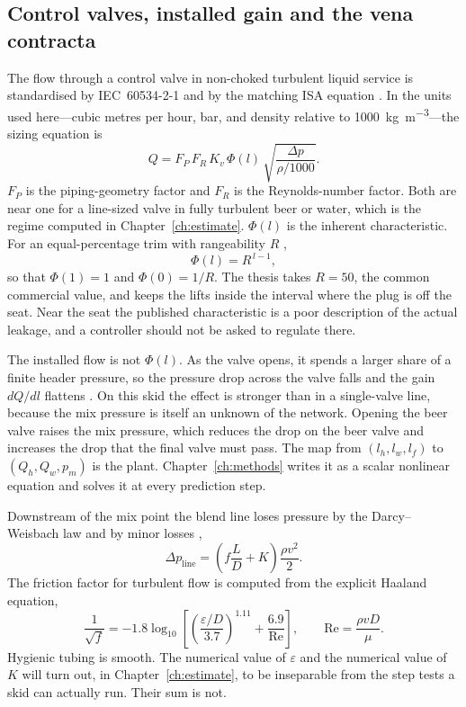 \subsection{Control valves, installed gain and the vena contracta}

The flow through a control valve in non-choked turbulent liquid service is standardised by IEC~60534-2-1 and by the matching ISA equation \citep{iec60534,isa75}. In the units used here---cubic metres per hour, bar, and density relative to \SI{1000}{\kilogram\per\cubic\metre}---the sizing equation is
\begin{equation}
\label{eq:kv}
Q = F_P\,F_R\,K_v\,\Phi(l)\,\sqrt{\frac{\Delta p}{\rho/1000}}.
\end{equation}
$F_P$ is the piping-geometry factor and $F_R$ is the Reynolds-number factor. Both are near one for a line-sized valve in fully turbulent beer or water, which is the regime computed in Chapter~\ref{ch:estimate}. $\Phi(l)$ is the inherent characteristic. For an equal-percentage trim with rangeability $R$ \citep{fisher2005},
\begin{equation}
\label{eq:eqpct}
\Phi(l) = R^{\,l-1},
\end{equation}
so that $\Phi(1)=1$ and $\Phi(0)=1/R$. The thesis takes $R=50$, the common commercial value, and keeps the lifts inside the interval where the plug is off the seat. Near the seat the published characteristic is a poor description of the actual leakage, and a controller should not be asked to regulate there.

The installed flow is not $\Phi(l)$. As the valve opens, it spends a larger share of a finite header pressure, so the pressure drop across the valve falls and the gain $dQ/dl$ flattens \citep{shinskey1996,fisher2005}. On this skid the effect is stronger than in a single-valve line, because the mix pressure is itself an unknown of the network. Opening the beer valve raises the mix pressure, which reduces the drop on the beer valve and increases the drop that the final valve must pass. The map from $(l_h,l_w,l_f)$ to $(Q_h,Q_w,p_m)$ is the plant. Chapter~\ref{ch:methods} writes it as a scalar nonlinear equation and solves it at every prediction step.

Downstream of the mix point the blend line loses pressure by the Darcy--Weisbach law and by minor losses \citep{white2011,crane2009},
\begin{equation}
\label{eq:darcy}
\Delta p_{\mathrm{line}}
=
\left(f\frac{L}{D} + K\right)\frac{\rho v^{2}}{2}.
\end{equation}
The friction factor for turbulent flow is computed from the explicit Haaland equation,
\begin{equation}
\label{eq:haaland}
\frac{1}{\sqrt{f}}
=
-1.8\log_{10}\!\left[
\left(\frac{\varepsilon/D}{3.7}\right)^{1.11}
+
\frac{6.9}{\mathrm{Re}}
\right],
\qquad
\mathrm{Re} = \frac{\rho v D}{\mu}.
\end{equation}
Hygienic tubing is smooth. The numerical value of $\varepsilon$ and the numerical value of $K$ will turn out, in Chapter~\ref{ch:estimate}, to be inseparable from the step tests a skid can actually run. Their sum is not.

